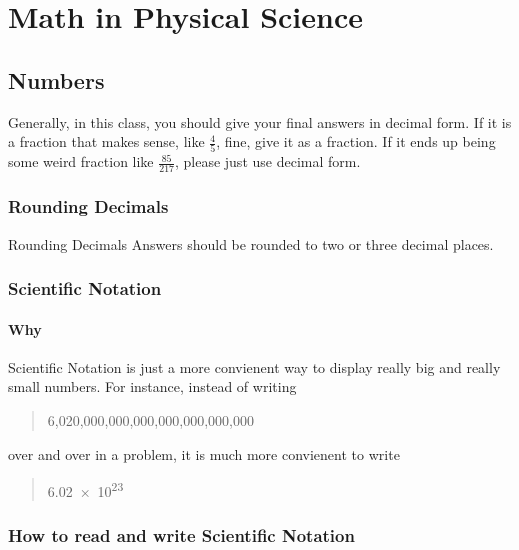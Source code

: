 \documentclass[../../Main/main.tex]{subfiles}
\begin{document}

\chapter{Math in Physical Science}

\section{Numbers}

Generally, in this class, you should give your final answers in decimal form.  If it is a fraction that makes sense, like \(\frac{4}{5}\), fine, give it as a fraction.  If it ends up being some weird fraction like \(\frac{85}{217}\), please just use decimal form.\\

\subsection{Rounding Decimals}

\begin{boxPink}{Rounding Decimals}
	Answers should be rounded to two or three decimal places.
\end{boxPink}


\subsection{Scientific Notation}

\subsubsection{Why}

Scientific Notation is just a more convienent way to display really big and really small numbers.  For instance, instead of writing

\begin{quote}
	{\huge 6,020,000,000,000,000,000,000,000}
\end{quote}

over and over in a problem, it is much more convienent to write

\begin{quote}
	{\huge \num{6.02e23}}
\end{quote}

\newpage
\subsection{How to read and write Scientific Notation}
\end{document}
